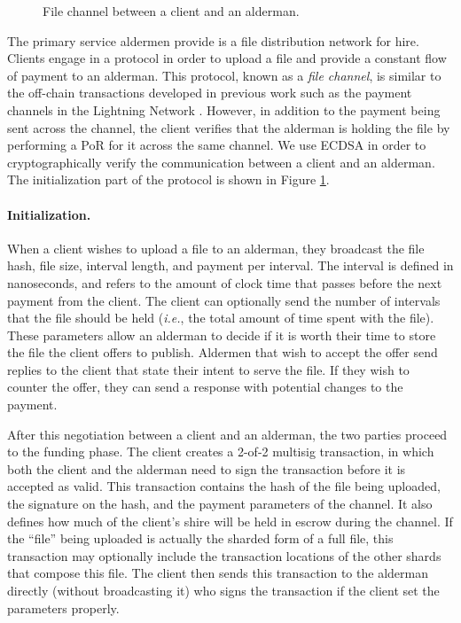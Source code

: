 \documentclass{article}
\begin{document}
\begin{figure}[t]
  \centering
  \fbox{\rule[-.5cm]{4cm}{4cm} \rule[-.5cm]{4cm}{0cm}}
  \caption{File channel between a client and an alderman.}
  \label{fig:channel}
\end{figure}

The primary service aldermen provide is a file distribution network for hire.
Clients engage in a protocol in order to upload a file and provide a constant
flow of payment to an alderman. This
protocol, known as a \emph{file channel}, is similar to the off-chain
transactions developed in previous work such as the payment channels in the
Lightning Network \cite{lightning}. However, in addition to the payment being
sent across the channel, the client verifies that the alderman is holding the
file by performing a PoR for it across the same channel. We use ECDSA in order
to cryptographically verify the communication between a client and an alderman.
The initialization part of the protocol is shown in Figure \ref{fig:channel}.

\paragraph{Initialization.} When a client wishes to upload a file to an
alderman, they broadcast the file hash, file size, interval length, and payment
per interval. The interval is defined in nanoseconds, and refers to the amount
of clock time that passes before the next payment from the client. The client
can optionally send the number of intervals that the file should be held
(\emph{i.e.}, the total amount of time spent with the file). These parameters
allow an alderman to decide if it is worth their time to store the file the
client offers to publish. Aldermen that wish to accept the offer send replies to
the client that state their intent to serve the file. If they wish to counter
the offer, they can send a response with potential changes to the payment.

After this negotiation between a client and an alderman, the two parties proceed
to the funding phase. The client creates a 2-of-2 multisig transaction, in which
both the client and the alderman need to sign the transaction before it is
accepted as valid. This transaction contains the hash of the file being
uploaded, the signature on the hash, and the payment parameters of the channel.
It also defines how much of the client's shire will be held in escrow during the
channel. If the ``file'' being uploaded is actually the sharded form of a full
file, this transaction may optionally include the transaction locations of the
other shards that compose this file. The client then sends this transaction to
the alderman directly (without broadcasting it) who signs the transaction if the
client set the parameters properly.
\end{document}
